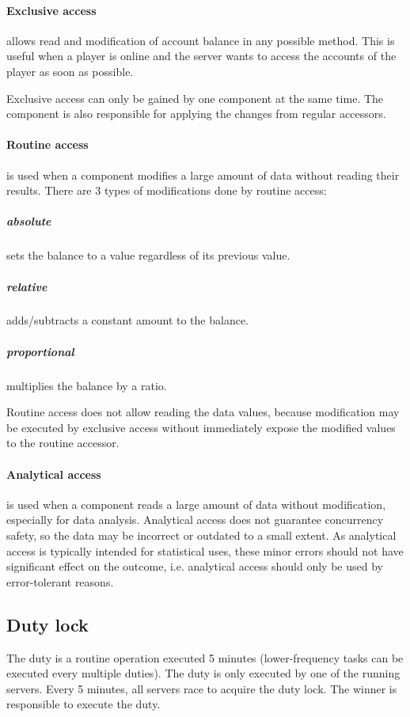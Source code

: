 \documentclass{report}
\begin{document}
					\paragraph{Exclusive access} allows read and modification of account balance in any possible method.
						This is useful when a player is online and the server wants to access the accounts of the player as soon as possible.

						Exclusive access can only be gained by one component at the same time.
						The component is also responsible for applying the changes from regular accessors.

					\paragraph{Routine access} is used when a component modifies a large amount of data without reading their results.
						There are 3 types of modifications done by routine access:
						\subparagraph{absolute} sets the balance to a value regardless of its previous value.
						\subparagraph{relative} adds/subtracts a constant amount to the balance.
						\subparagraph{proportional} multiplies the balance by a ratio.

						Routine access does not allow reading the data values, because modification may be executed by exclusive access
						without immediately expose the modified values to the routine accessor.

					\paragraph{Analytical access} is used when a component reads a large amount of data without modification, especially for data analysis.
					Analytical access does not guarantee concurrency safety, so the data may be incorrect or outdated to a small extent.
					As analytical access is typically intended for statistical uses, these minor errors should not have significant effect on the outcome,
					i.e. analytical access should only be used by error-tolerant reasons.

				\subsection{Duty lock}
					The duty is a routine operation executed 5 minutes (lower-frequency tasks can be executed every multiple duties).
					The duty is only executed by one of the running servers.
					Every 5 minutes, all servers race to acquire the duty lock.
					The winner is responsible to execute the duty.
\end{document}
